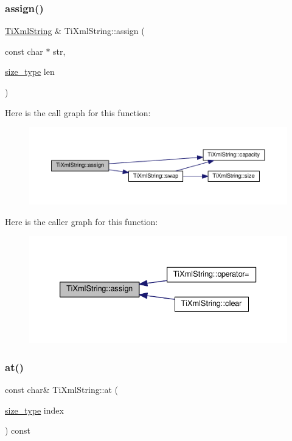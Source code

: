 \subsubsection{\texorpdfstring{assign()}{assign()}}
{\footnotesize\ttfamily \hyperlink{class_ti_xml_string}{Ti\+Xml\+String} \& Ti\+Xml\+String\+::assign (\begin{DoxyParamCaption}\item[{const char $\ast$}]{str,  }\item[{\hyperlink{class_ti_xml_string_abeb2c1893a04c17904f7c06546d0b971}{size\+\_\+type}}]{len }\end{DoxyParamCaption})}

Here is the call graph for this function\+:\nopagebreak
\begin{figure}[H]
\begin{center}
\leavevmode
\includegraphics[width=350pt]{class_ti_xml_string_ac72f3d9149b7812c1e6c59402014d0d5_cgraph}
\end{center}
\end{figure}
Here is the caller graph for this function\+:\nopagebreak
\begin{figure}[H]
\begin{center}
\leavevmode
\includegraphics[width=333pt]{class_ti_xml_string_ac72f3d9149b7812c1e6c59402014d0d5_icgraph}
\end{center}
\end{figure}
\mbox{\label{class_ti_xml_string_a7f33c37f7dfde5193f02521d2a7af1db}} 
\subsubsection{\texorpdfstring{at()}{at()}}
{\footnotesize\ttfamily const char\& Ti\+Xml\+String\+::at (\begin{DoxyParamCaption}\item[{\hyperlink{class_ti_xml_string_abeb2c1893a04c17904f7c06546d0b971}{size\+\_\+type}}]{index }\end{DoxyParamCaption}) const\hspace{0.3cm}{\ttfamily [inline]}}

